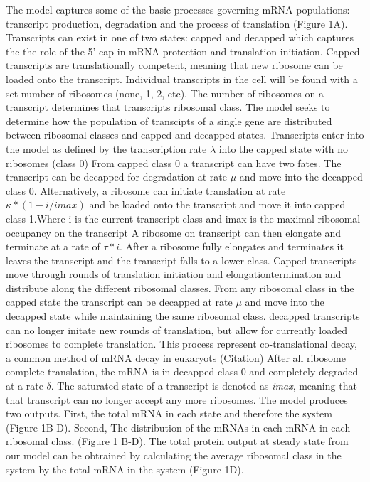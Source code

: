 \documentclass[review]{elsarticle}
\begin{document}
The model captures some of the basic processes governing mRNA populations: transcript production, degradation and the process of translation (Figure 1A).
Transcripts can exist in one of two states: capped and decapped which captures the the role of the 5' cap in mRNA protection and translation initiation. 
Capped transcripts are translationally competent, meaning that new ribosome can be loaded onto the transcript. 
Individual transcripts in the cell will be found with a set number of ribosomes (none, 1, 2, etc).
The number of ribosomes on a transcript determines that transcripts ribosomal class.
The model seeks to determine how the population of transcipts of a single gene are distributed between ribosomal classes and capped and decapped states.
Transcripts enter into the model as defined by the transcription rate $\lambda$ into the capped state with no ribosomes (class 0)
From capped class 0 a transcript can have two fates. 
The transcript can be decapped for degradation at rate $\mu$ and move into the decapped class 0.
Alternatively, a ribosome can initiate translation at rate $\kappa*(1-i/imax)$ and be loaded onto the transcript and move it into capped class 1.Where i is the current transcript class and imax is the maximal ribosomal occupancy on the transcript
A ribosome on transcript can then elongate and terminate at a rate of $\tau * i$. After a ribosome fully elongates and terminates it leaves the transcript and the transcript falls to a lower class.
Capped transcripts move through rounds of translation initiation and elongation\/termination and distribute along the different ribosomal classes. 
From any ribosomal class in the capped state the transcript can be decapped at rate $\mu$  and move into the decapped state while maintaining the same ribosomal class.
decapped transcripts can no longer initate new rounds of translation, but allow for currently loaded ribosomes to complete translation. 
This process represent co-translational decay, a common method of mRNA decay in eukaryots (Citation) 
After all ribosome complete translation, the mRNA is in decapped class 0 and completely degraded at a rate $\delta$.
The saturated state of a transcript is denoted as \emph{imax}, meaning that that transcript can no longer accept any more ribosomes. 
The model produces two outputs. 
First, the total mRNA in each state and therefore the system (Figure 1B-D). 
Second, The distribution of the mRNAs in each mRNA in each ribosomal class. (Figure 1 B-D).
The total protein output at steady state from our model can be obtrained by calculating the average ribosomal class in the system by the total mRNA in the system (Figure 1D). 
\end{document}
